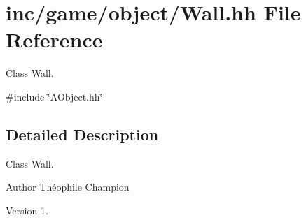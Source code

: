 \hypertarget{Wall_8hh}{}\section{inc/game/object/\+Wall.hh File Reference}
\label{Wall_8hh}


Class Wall.  


{\ttfamily \#include \char`\"{}A\+Object.\+hh\char`\"{}}\newline


\subsection{Detailed Description}
Class Wall. 

\begin{DoxyAuthor}{Author}
Théophile Champion 
\end{DoxyAuthor}
\begin{DoxyVersion}{Version}
1. 
\end{DoxyVersion}
